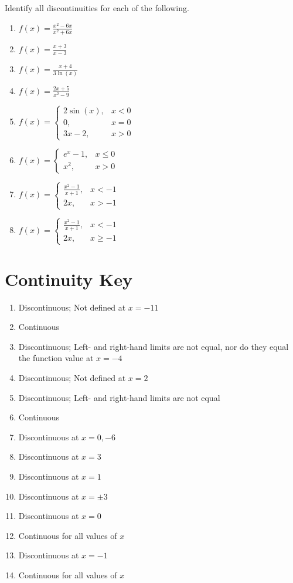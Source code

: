 Identify all discontinuities for each of the following.
\begin{multicols}{2}
\begin{enumerate}		\setcounter{enumi}{\value{Review}}
	\item $f(x) = \frac{x^2-6x}{x^2+6x}$
	\item $f(x) = \frac{x+3}{x-3}$
	\item $f(x) = \frac{x+4}{3\ln(x)}$
	\item $f(x) = \frac{2x+5}{x^2-9}$ \\[1in]
	\item $f(x) = \begin{cases} 
			2 \sin(x), & x < 0 \\
			0, & x = 0 \\
			3x-2, & x > 0	\end{cases}$
	\item $f(x) = \begin{cases}
	e^x - 1, & x \leq 0 \\
	x^2, & x > 0 \end{cases}$
	\item $f(x) = \begin{cases}
		\frac{x^2-1}{x+1}, & x < -1 \\
		2x, & x > -1 \end{cases}$
	\item $f(x) = \begin{cases}
		\frac{x^2-1}{x+1}, & x < -1 \\
		2x, & x \geq -1 \end{cases}$
\end{enumerate}
\end{multicols}

\newpage

\section*{Continuity Key}

\begin{enumerate}
	\item Discontinuous; Not defined at $x = -11$
	\item Continuous
	\item Discontinuous; Left- and right-hand limits are not equal, nor do they equal the function value at $x = -4$
	\item Discontinuous; Not defined at $x = 2$
	\item Discontinuous; Left- and right-hand limits are not equal
	\item Continuous
	\item Discontinuous at $x = 0, -6$
	\item Discontinuous at $x = 3$
	\item Discontinuous at $x = 1$
	\item Discontinuous at $x = \pm 3$
	\item Discontinuous at $x = 0$
	\item Continuous for all values of $x$
	\item Discontinuous at $x = -1$
	\item Continuous for all values of $x$
\end{enumerate}